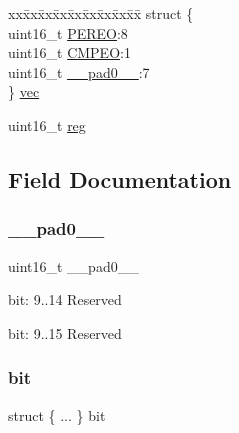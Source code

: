 \begin{DoxyCompactItemize}
\begin{tabbing}
\end{tabbing}\item 
\begin{tabbing}
xx\=xx\=xx\=xx\=xx\=xx\=xx\=xx\=xx\=\kill
struct \{\\
\>uint16\_t \mbox{\hyperlink{union_r_t_c___m_o_d_e0___e_v_c_t_r_l___type_a936998d42a0d7673dd317bdd16f1f224}{PEREO}}:8\\
\>uint16\_t \mbox{\hyperlink{union_r_t_c___m_o_d_e0___e_v_c_t_r_l___type_ad757caef95396eab9089e7558e4f706e}{CMPEO}}:1\\
\>uint16\_t \mbox{\hyperlink{union_r_t_c___m_o_d_e0___e_v_c_t_r_l___type_a77132c2c26a75f5b8751b235cda23828}{\_\_pad0\_\_}}:7\\
\} \mbox{\hyperlink{union_r_t_c___m_o_d_e0___e_v_c_t_r_l___type_a9aa64c6b72b9ed24749017ea488fc991}{vec}}\\

\end{tabbing}\item 
uint16\+\_\+t \mbox{\hyperlink{union_r_t_c___m_o_d_e0___e_v_c_t_r_l___type_a11760f5020019f4aa8cb02e694f7cc44}{reg}}
\end{DoxyCompactItemize}


\subsection{Field Documentation}
\mbox{\label{union_r_t_c___m_o_d_e0___e_v_c_t_r_l___type_a77132c2c26a75f5b8751b235cda23828}} 
\subsubsection{\texorpdfstring{\_\_pad0\_\_}{\_\_pad0\_\_}}
{\footnotesize\ttfamily uint16\+\_\+t \+\_\+\+\_\+pad0\+\_\+\+\_\+}

bit\+: 9..14 Reserved

bit\+: 9..15 Reserved \mbox{\label{union_r_t_c___m_o_d_e0___e_v_c_t_r_l___type_a1ac54aab70de9fc9d437dabe56781b3b}} 
\subsubsection{\texorpdfstring{bit}{bit}}
{\footnotesize\ttfamily struct \{ ... \}   bit}

